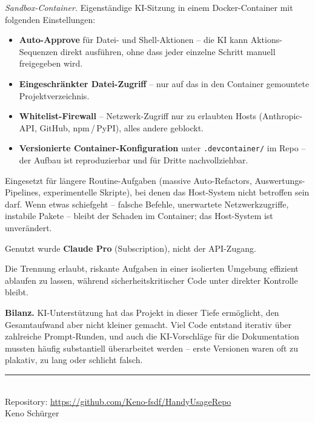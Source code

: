 \documentclass[12pt, a4paper, ngerman]{article}
\newcommand{\code}[1]{\texttt{#1}}
\begin{document}
\textit{Sandbox-Container.}
Eigenständige KI-Sitzung in einem Docker-Container mit folgenden
Einstellungen:

\begin{itemize}
\item \textbf{Auto-Approve} für Datei- und Shell-Aktionen --
  die KI kann Aktions-Sequenzen direkt ausführen, ohne dass jeder
  einzelne Schritt manuell freigegeben wird.
\item \textbf{Eingeschränkter Datei-Zugriff} -- nur auf das in den
  Container gemountete Projektverzeichnis.
\item \textbf{Whitelist-Firewall} -- Netzwerk-Zugriff nur zu
  erlaubten Hosts (Anthropic-API, GitHub, npm\,/\,PyPI), alles
  andere geblockt.
\item \textbf{Versionierte Container-Konfiguration} unter
  \code{.devcontainer/} im Repo -- der Aufbau ist reproduzierbar
  und für Dritte nachvollziehbar.
\end{itemize}

Eingesetzt für längere Routine-Aufgaben (massive Auto-Refactors,
Auswertungs-Pipelines, experimentelle Skripte), bei denen das
Host-System nicht betroffen sein darf. Wenn etwas schiefgeht --
falsche Befehle, unerwartete Netzwerkzugriffe, instabile Pakete
-- bleibt der Schaden im Container; das Host-System ist unverändert.

Genutzt wurde \textbf{Claude Pro} (Subscription), nicht der
API-Zugang.

Die Trennung erlaubt, riskante Aufgaben in einer isolierten
Umgebung effizient ablaufen zu lassen, während sicherheitskritischer
Code unter direkter Kontrolle bleibt.

\textbf{Bilanz.}
KI-Unterstützung hat das Projekt in dieser Tiefe ermöglicht, den
Gesamtaufwand aber nicht kleiner gemacht. Viel Code entstand
iterativ über zahlreiche Prompt-Runden, und auch die
KI-Vorschläge für die Dokumentation mussten häufig substantiell
überarbeitet werden -- erste Versionen waren oft zu plakativ, zu
lang oder schlicht falsch.

\vspace{1.5em}

\begin{center}
\rule{0.6\linewidth}{0.4pt}\\[0.5em]
{\small Repository: \url{https://github.com/Keno-fsdf/HandyUsageRepo}}\\[0.3em]
{\small Keno Schürger}
\end{center}

\newpage

\nocite{pedregosa2011scikit,kingma2015adam,jacob2018quantization,bai2018tcn,bergmeir2012cv,david2021tflitemicro}


\end{document}
